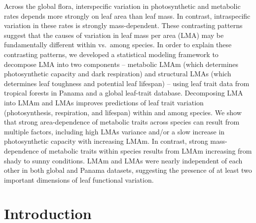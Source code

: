 \documentclass[
  12pt,
  letterpaper,
  DIV=11,
  numbers=noendperiod]{scrartcl}
\begin{document}
Across the global flora, interspecific variation in photosynthetic and
metabolic rates depends more strongly on leaf area than leaf mass. In
contrast, intraspecific variation in these rates is strongly
mass-dependent. These contrasting patterns suggest that the causes of
variation in leaf mass per area (LMA) may be fundamentally different
within vs.~among species. In order to explain these contrasting
patterns, we developed a statistical modeling framework to decompose LMA
into two components -- metabolic LMAm (which determines photosynthetic
capacity and dark respiration) and structural LMAs (which determines
leaf toughness and potential leaf lifespan) -- using leaf trait data
from tropical forests in Panama and a global leaf-trait database.
Decomposing LMA into LMAm and LMAs improves predictions of leaf trait
variation (photosynthesis, respiration, and lifespan) within and among
species. We show that strong area-dependence of metabolic traits across
species can result from multiple factors, including high LMAs variance
and/or a slow increase in photosynthetic capacity with increasing LMAm.
In contrast, strong mass-dependence of metabolic traits within species
results from LMAm increasing from shady to sunny conditions. LMAm and
LMAs were nearly independent of each other in both global and Panama
datasets, suggesting the presence of at least two important dimensions
of leaf functional variation.

\section{Introduction}\label{introduction}
\end{document}
